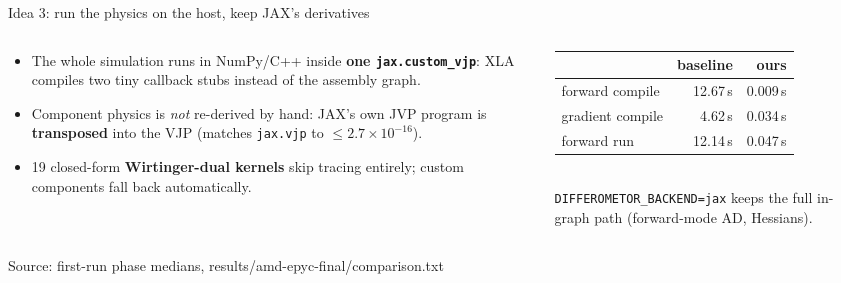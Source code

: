 \documentclass[aspectratio=169,11pt]{beamer}
\newcommand{\hl}[1]{\textcolor{accent}{\textbf{#1}}}
\newcommand{\src}[1]{\par\vfill{\color{muted}\scriptsize Source: #1}}
\begin{document}
\begin{frame}{Idea 3: run the physics on the host, keep JAX's derivatives}
  \begin{columns}[c]
    \begin{column}{0.5\textwidth}
      \begin{itemize}
        \item The whole simulation runs in NumPy/C++ inside \hl{one \texttt{jax.custom\_vjp}}: XLA compiles two tiny callback stubs instead of the assembly graph.
        \item Component physics is \emph{not} re-derived by hand: JAX's own JVP program is \hl{transposed} into the VJP (matches \texttt{jax.vjp} to $\le 2.7\times10^{-16}$).
        \item 19 closed-form \hl{Wirtinger-dual kernels} skip tracing entirely; custom components fall back automatically.
      \end{itemize}
    \end{column}
    \begin{column}{0.48\textwidth}
      \centering
      \begin{tabular}{@{}lrr@{}}
        \toprule
        & baseline & ours \\
        \midrule
        forward compile & 12.67\,s & 0.009\,s \\
        gradient compile & 4.62\,s & 0.034\,s \\
        forward run & 12.14\,s & 0.047\,s \\
        \bottomrule
      \end{tabular}\\[0.8em]
      {\small\color{muted} \texttt{DIFFEROMETOR\_BACKEND=jax} keeps the full in-graph path (forward-mode AD, Hessians).}
    \end{column}
  \end{columns}
  \src{first-run phase medians, results/amd-epyc-final/comparison.txt}
\end{frame}
\end{document}
